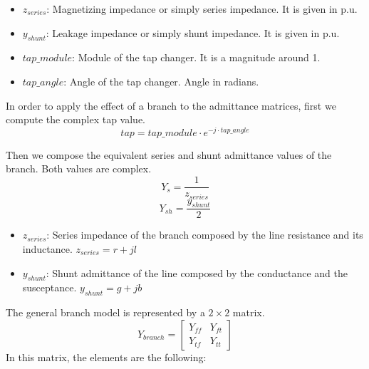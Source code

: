 \documentclass[nols,a4paper,twoside,notoc,fleqn]{tufte-book}
\begin{document}
\begin{itemize}
	\item $z_{series}$: Magnetizing impedance or simply series impedance. It is given in p.u.
	\item $y_{shunt}$: Leakage impedance or simply shunt impedance. It is given in p.u.
	\item $tap\_module$: Module of the tap changer. It is a magnitude around 1.
	\item $tap\_angle$: Angle of the tap changer. Angle in radians.\newline
\end{itemize}




In order to apply the effect of a branch to the admittance matrices, first we compute the complex tap value.
$$tap = tap\_module \cdot e^{-j \cdot tap\_angle}$$  



Then we compose the equivalent series and shunt admittance values of the branch. Both values are complex.
$$Y_s = \frac{1}{z_{series}}$$
$$Y_{sh} = \frac{y_{shunt}}{2}$$

\begin{itemize}
	\item $z_{series}$: Series impedance of the branch composed by the line resistance and its inductance. $z_{series}=r + jl$
	
	\item $y_{shunt}$: Shunt admittance of the line composed by the conductance and the susceptance. $y_{shunt}=g+jb$\newline
\end{itemize}



The general branch model is represented by a $2 \times 2$ matrix.
$$
Y_{branch}=\left[ \begin{array}{ccc}
Y_{ff} & Y_{ft} \\
Y_{tf} & Y_{tt} \end{array} \right]
$$
In this matrix, the elements are the following:
\end{document}
